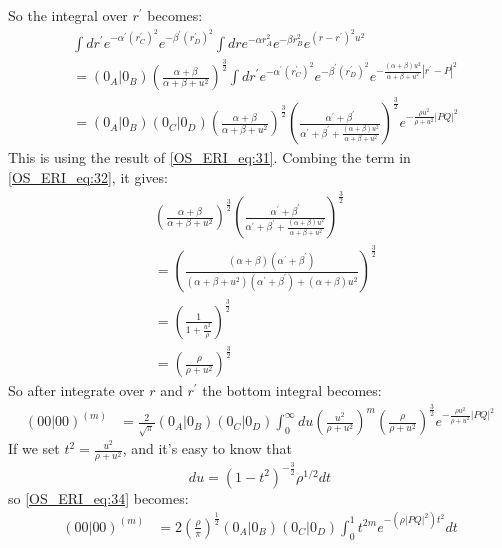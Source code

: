  So the integral over $r^{'}$ becomes:
\begin{equation}
 \begin{split}
   &\int dr^{'}  e^{-\alpha^{'} (r^{'}_{C})^{2}}e^{-\beta^{'} (r^{'}_{D})^{2}} 
   \int dr  e^{-\alpha r_{A}^{2}} e^{-\beta r_{B}^{2}} e^{(r-r^{'})^{2}u^{2}} \\
&= (0_{A}|0_{B})\left( \frac{\alpha+\beta}{\alpha+\beta+u^{2}}\right)^{\frac{3}{2}}   
  \int dr^{'}  e^{-\alpha^{'} (r^{'}_{C})^{2}}e^{-\beta^{'} (r^{'}_{D})^{2}} 
   e^{-\frac{(\alpha+\beta)u^{2}}{\alpha+\beta+u^{2}}|r^{'}-P|^{2}} \\
&= (0_{A}|0_{B})(0_{C}|0_{D})
\left( \frac{\alpha+\beta}{\alpha+\beta+u^{2}}\right)^{\frac{3}{2}} 
\left( \frac{\alpha^{'}+\beta^{'}}{\alpha^{'}+\beta^{'}+ 
\frac{(\alpha+\beta)u^{2}}{\alpha+\beta+u^{2}}}\right)^{\frac{3}{2}}
e^{-\frac{\rho u^{2}}{\rho+ u^{2}}|PQ|^{2}}
\end{split} 
\label{OS_ERI_eq:32}
\end{equation}
This is using the result of \ref{OS_ERI_eq:31}. Combing the term in \ref{OS_ERI_eq:32},
it gives:
\begin{equation}
\begin{split}
 &\left( \frac{\alpha+\beta}{\alpha+\beta+u^{2}}\right)^{\frac{3}{2}} 
\left( \frac{\alpha^{'}+\beta^{'}}{\alpha^{'}+\beta^{'}+ 
\frac{(\alpha+\beta)u^{2}}{\alpha+\beta+u^{2}}}\right)^{\frac{3}{2}} \\
&= \left( \frac{(\alpha+\beta)(\alpha^{'}+\beta^{'})}
{(\alpha+\beta+u^{2})(\alpha^{'}+\beta^{'})+(\alpha+\beta)u^{2}}\right)^{\frac{3}{2}}\\
&= \left(\frac{1}{1+\frac{u^{2}}{\rho}}\right)^{\frac{3}{2}} \\
&= \left(\frac{\rho}{\rho+u^{2}}\right)^{\frac{3}{2}}
\end{split}
 \label{OS_ERI_eq:33}
\end{equation}
So after integrate over $r$ and $r^{'}$ the bottom integral becomes:
\begin{equation}
 \begin{split}
 (00|00)^{(m)} &=\frac{2}{\sqrt{\pi}}(0_{A}|0_{B})(0_{C}|0_{D})
 \int_{0}^{\infty} du \left( \frac{u^{2}}{\rho+u^{2}}\right)^{m}
 \left(\frac{\rho}{\rho+u^{2}}\right)^{\frac{3}{2}}
 e^{-\frac{\rho u^{2}}{\rho+ u^{2}}|PQ|^{2}} 
 \end{split}
\label{OS_ERI_eq:34}
\end{equation}
If we set $t^{2} = \frac{u^{2}}{\rho+ u^{2}}$, and it's easy to know
that 
\begin{equation}
 du = (1-t^{2})^{-\frac{3}{2}}\rho^{1/2} dt
 \label{OS_ERI_eq:35}
\end{equation}
so \ref{OS_ERI_eq:34} becomes:
\begin{equation}
 \begin{split}
 (00|00)^{(m)} &= 2\left( \frac{\rho}{\pi}\right)^{\frac{1}{2}}(0_{A}|0_{B})
(0_{C}|0_{D})\int^{1}_{0} t^{2m} e^{-(\rho|PQ|^{2})t^{2}} dt 
 \end{split}
\label{OS_ERI_complementary_result}
\end{equation}

